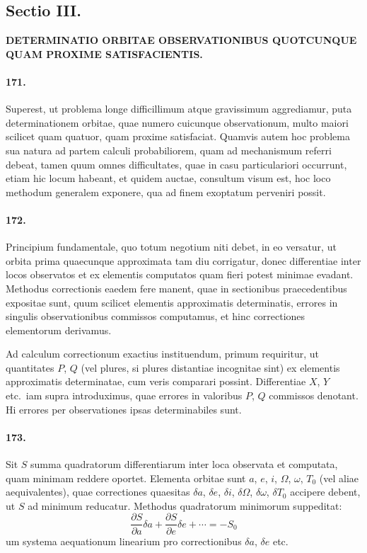 \documentclass[12pt,a4paper]{article}
\begin{document}
\newpage
\subsection*{Sectio III.}

\begin{center}
\textbf{DETERMINATIO ORBITAE OBSERVATIONIBUS QUOTCUNQUE QUAM PROXIME SATISFACIENTIS.}
\end{center}

\paragraph{171.}
Superest, ut problema longe difficillimum atque gravissimum aggrediamur, puta determinationem orbitae, quae numero cuicunque observationum, multo maiori scilicet quam quatuor, quam proxime satisfaciat. Quamvis autem hoc problema sua natura ad partem calculi probabiliorem, quam ad mechanismum referri debeat, tamen quum omnes difficultates, quae in casu particulariori occurrunt, etiam hic locum habeant, et quidem auctae, consultum visum est, hoc loco methodum generalem exponere, qua ad finem exoptatum perveniri possit.

\paragraph{172.}
Principium fundamentale, quo totum negotium niti debet, in eo versatur, ut orbita prima quaecunque approximata tam diu corrigatur, donec differentiae inter locos observatos et ex elementis computatos quam fieri potest minimae evadant. Methodus correctionis eaedem fere manent, quae in sectionibus praecedentibus expositae sunt, quum scilicet elementis approximatis determinatis, errores in singulis observationibus commissos computamus, et hinc correctiones elementorum derivamus.

Ad calculum correctionum exactius instituendum, primum requiritur, ut quantitates $P$, $Q$ (vel plures, si plures distantiae incognitae sint) ex elementis approximatis determinatae, cum veris comparari possint. Differentiae $X$, $Y$ etc.~iam supra introduximus, quae errores in valoribus $P$, $Q$ commissos denotant. Hi errores per observationes ipsas determinabiles sunt.

\paragraph{173.}
Sit $S$ summa quadratorum differentiarum inter loca observata et computata, quam minimam reddere oportet. Elementa orbitae sunt $a$, $e$, $i$, $\Omega$, $\omega$, $T_0$ (vel aliae aequivalentes), quae correctiones quaesitas $\delta a$, $\delta e$, $\delta i$, $\delta\Omega$, $\delta\omega$, $\delta T_0$ accipere debent, ut $S$ ad minimum reducatur. Methodus quadratorum minimorum suppeditat:
\[
\frac{\partial S}{\partial a}\delta a + \frac{\partial S}{\partial e}\delta e + \cdots = -S_0
\]
um systema aequationum linearium pro correctionibus $\delta a$, $\delta e$ etc.
\end{document}
